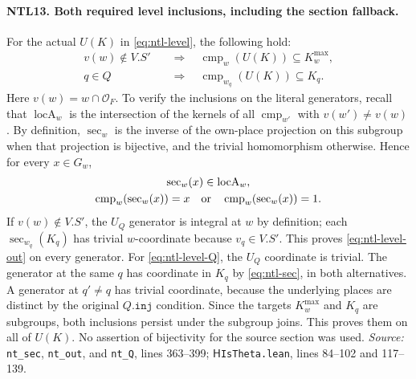 \paragraph{NTL13. Both required level inclusions, including the section fallback.}
\label{claim:NTL13}
For the actual \(U(K)\) in \eqref{eq:ntl-level}, the following hold:
\begin{align}
 v(w)\notin V.S'&\quad\Longrightarrow\quad
           \operatorname{cmp}_w(U(K))\subseteq K_w^{\max},
                 \label{eq:ntl-level-out}\\
 q\in Q&\quad\Longrightarrow\quad
           \operatorname{cmp}_{w_q}(U(K))\subseteq K_q.
                 \label{eq:ntl-level-Q}
\end{align}
Here \(v(w)=w\cap\mathcal O_F\).  To verify the inclusions on the
literal generators, recall that \(\operatorname{locA}_w\) is the
intersection of the kernels of all \(\operatorname{cmp}_{w'}\)
with \(v(w')\ne v(w)\).  By definition,
\(\operatorname{sec}_w\) is the inverse of the own-place projection
on this subgroup when that projection is bijective, and the trivial
homomorphism otherwise.  Hence for every \(x\in G_w\),
\begin{equation}\label{eq:ntl-sec}
 \begin{gathered}
 \operatorname{sec}_w(x)\in\operatorname{locA}_w,\\
 \operatorname{cmp}_w(\operatorname{sec}_w(x))=x
        \quad\hbox{or}\quad
 \operatorname{cmp}_w(\operatorname{sec}_w(x))=1.
 \end{gathered}
\end{equation}
If \(v(w)\notin V.S'\), the \(U_Q\) generator is integral at \(w\)
by definition; each \(\operatorname{sec}_{w_q}(K_q)\) has trivial
\(w\)-coordinate because \(v_q\in V.S'\).  This proves
\eqref{eq:ntl-level-out} on every generator.  For
\eqref{eq:ntl-level-Q}, the \(U_Q\) coordinate is trivial.
The generator at the same \(q\) has coordinate in \(K_q\) by
\eqref{eq:ntl-sec}, in both alternatives.  A generator at \(q'\ne q\)
has trivial coordinate, because the underlying places are distinct
by the original \(Q.\texttt{inj}\) condition.  Since the targets
\(K_w^{\max}\) and \(K_q\) are subgroups, both inclusions persist
under the subgroup joins.  This proves them on all of \(U(K)\).
No assertion of bijectivity for the source section was used.
\emph{Source:} \texttt{nt\_sec}, \texttt{nt\_out}, and
\texttt{nt\_Q}, lines 363--399; \(\mathsf H\)\texttt{IsTheta.lean},
lines 84--102 and 117--139.

